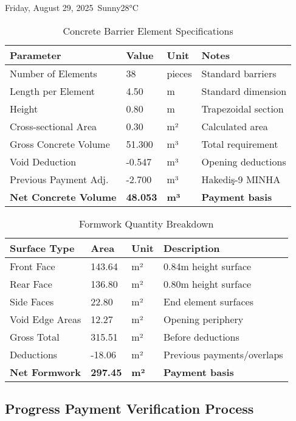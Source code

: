 \begin{dailyentry}{Friday, August 29, 2025}{\weathersunny\ Sunny}{28°C}
\begin{table}[ht]
\centering
\caption{Concrete Barrier Element Specifications}
\begin{tabular}{@{}p{3.5cm}p{3cm}p{3cm}p{3.5cm}@{}}
\toprule
\textbf{Parameter} & \textbf{Value} & \textbf{Unit} & \textbf{Notes} \\
\midrule
Number of Elements & 38 & pieces & Standard barriers \\
Length per Element & 4.50 & m & Standard dimension \\
Height & 0.80 & m & Trapezoidal section \\
Cross-sectional Area & 0.30 & m² & Calculated area \\
\midrule
Gross Concrete Volume & 51.300 & m³ & Total requirement \\
Void Deduction & -0.547 & m³ & Opening deductions \\
Previous Payment Adj. & -2.700 & m³ & Hakediş-9 MINHA \\
\textbf{Net Concrete Volume} & \textbf{48.053} & \textbf{m³} & \textbf{Payment basis} \\
\bottomrule
\end{tabular}
\end{table}

\begin{table}[ht]
\centering
\caption{Formwork Quantity Breakdown}
\begin{tabular}{@{}p{3cm}p{2.5cm}p{2.5cm}p{4cm}@{}}
\toprule
\textbf{Surface Type} & \textbf{Area} & \textbf{Unit} & \textbf{Description} \\
\midrule
Front Face & 143.64 & m² & 0.84m height surface \\
Rear Face & 136.80 & m² & 0.80m height surface \\
Side Faces & 22.80 & m² & End element surfaces \\
Void Edge Areas & 12.27 & m² & Opening periphery \\
\midrule
Gross Total & 315.51 & m² & Before deductions \\
Deductions & -18.06 & m² & Previous payments/overlaps \\
\textbf{Net Formwork} & \textbf{297.45} & \textbf{m²} & \textbf{Payment basis} \\
\bottomrule
\end{tabular}
\end{table}

\vspace{1cm}

\subsection*{Progress Payment Verification Process}


\end{dailyentry}
